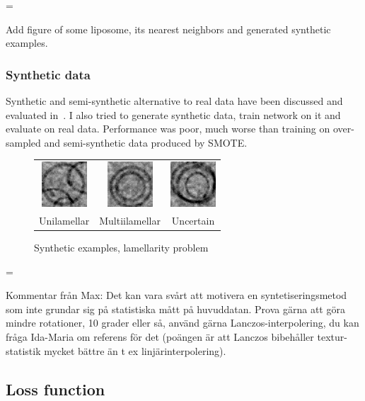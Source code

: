 \documentclass[a4paper, 11pt, table]{article}
\newenvironment{warning}
  {\par\begin{mdframed}[linewidth=2pt,linecolor=red]%
    \begin{list}{}{\leftmargin=1cm
                   \labelwidth=\leftmargin}\item[\Large\ding{43}]}
  {\end{list}\end{mdframed}\par}
\begin{document}
\begin{warning}
Add figure of some liposome, its nearest neighbors and generated synthetic examples.
\end{warning}

\subsubsection{Synthetic data}
Synthetic and semi-synthetic alternative to real data have been discussed and evaluated in~\cite{ishaq_synthetic}. I also tried to generate synthetic data, train network on it and evaluate on real data. Performance was poor, much worse than training on over-sampled and semi-synthetic data produced by SMOTE. 

\begin{figure}[H]
\centering
\begin{tabular}{ccc}
	\includegraphics[scale=1.5]{synthetic/uni.png} & \includegraphics[scale=1.5]{synthetic/multi.png} & \includegraphics[scale=1.5]{synthetic/uncertain.png} \\
	Unilamellar & Multiilamellar & Uncertain \\[6pt]
\end{tabular}
\caption{Synthetic examples, lamellarity problem}
\end{figure}

\begin{warning}
Kommentar från Max: Det kan vara svårt att motivera en syntetiseringsmetod som inte grundar sig på statistiska mått på huvuddatan. Prova gärna att göra mindre rotationer, 10 grader eller så, använd gärna Lanczos-interpolering, du kan fråga Ida-Maria om referens för det (poängen är att Lanczos bibehåller textur-statistik mycket bättre än t ex linjärinterpolering).
\end{warning} 

\subsection{Loss function}
\end{document}
